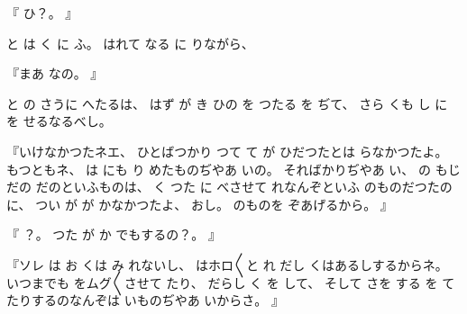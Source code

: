 『
ひ？。
』

と
は
く
に
ふ。
%
はれて
なる
に
りながら、

『まあ
なの。
』

と
の
さうに
へたるは、
%
はず
が
き
ひの
を
つたる
を
ぢて、
%
さら
くも
し
に
を
せるなるべし。

『いけなかつたネエ、
%
ひとばつかり
つて
て
が
ひだつたとは
らなかつたよ。
%
もつともネ、
%
は
にも
り
めたものぢやあ
いの。
%
そればかりぢやあ
い、
%
の
もじだの
だのといふものは、
%
く
つた
に
べさせて
れなんぞといふ
のものだつたのに、
%
つい
が
が
かなかつたよ、
%
おし。%
%
のものを
ぞあげるから。
』

『
？。
%
つた
が
か
でもするの？。
』

『ソレ
は%
お
くは
み
れないし、
%
はホロ〳〵と
れ
だし
くはあるしするからネ。
%
いつまでも
をムグ〳〵させて
たり、
%
だらし
く
を
して、
%
そして
さを
する
を
て
たりするのなんぞは
いものぢやあ
いからさ。
』

